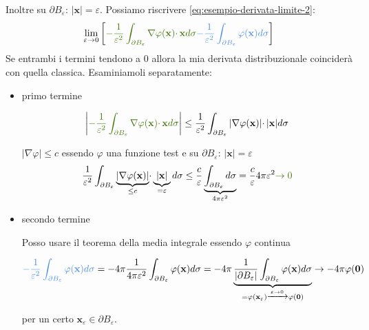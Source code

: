 \documentclass[10pt,a4paper,twoside,openright]{book}
\newcommand{\x}{\mathbf{x}}
\newcommand{\zer}{\mathbf{0}}
\begin{document}
Inoltre su $\displaystyle \partial B_{\varepsilon }$: $\displaystyle | \x| =\varepsilon $. Possiamo riscrivere \eqref{eq:esempio-derivata-limite-2}:
\begin{equation*}
	\lim _{\varepsilon \rightarrow 0}\left[\textcolor[rgb]{0.25,0.46,0.02}{-\frac{1}{\varepsilon ^{2}}\int _{\partial B_{\varepsilon }} \nabla \varphi (\x) \cdotp \x d\sigma }\textcolor[rgb]{0.29,0.56,0.89}{-\frac{1}{\varepsilon ^{2}}\int _{\partial B_{\varepsilon }} \varphi (\x) d\sigma }\right]
\end{equation*}
Se entrambi i termini tendono a $0$ allora la mia derivata distribuzionale coinciderà con quella classica. Esaminiamoli separatamente:
\begin{itemize}
	\item primo termine
	      
	      \begin{equation*}
	      	\left| \textcolor[rgb]{0.25,0.46,0.02}{-\frac{1}{\varepsilon ^{2}}\int _{\partial B_{\varepsilon }} \nabla \varphi (\x) \cdotp \x d\sigma }\right| \leqslant \frac{1}{\varepsilon ^{2}}\int _{\partial B_{\varepsilon }}| \nabla \varphi (\x)| \cdotp | \x| d\sigma 
	      \end{equation*}
	      
	      $\displaystyle | \nabla \varphi | \leqslant c$ essendo $\displaystyle \varphi $ una funzione test e su $\displaystyle \partial B_{\varepsilon }$: $\displaystyle | \x| =\varepsilon $\begin{equation*}
	      \frac{1}{\varepsilon ^{2}}\int _{\partial B_{\varepsilon }}\underbrace{| \nabla \varphi (\x)| }_{\leqslant c} \cdotp \underbrace{| \x| }_{=\varepsilon } d\sigma \leqslant \frac{c}{\varepsilon }\underbrace{\int _{\partial B_{\varepsilon }} d\sigma }_{4\pi \varepsilon ^{2}} =\frac{c}{\varepsilon } 4\pi \varepsilon ^{2}\textcolor[rgb]{0.25,0.46,0.02}{\rightarrow 0}
	\end{equation*}
	\item secondo termine
	      
	      Posso usare il teorema della media integrale essendo $\displaystyle \varphi $ continua
	      
	      \begin{equation*}
	      	\textcolor[rgb]{0.29,0.56,0.89}{-\frac{1}{\varepsilon ^{2}}\int _{\partial B_{\varepsilon }} \varphi (\x) d\sigma } =-4\pi \frac{1}{4\pi \varepsilon ^{2}}\int _{\partial B_{\varepsilon }} \varphi (\x) d\sigma =-4\pi \underbrace{\frac{1}{| \partial B_{\varepsilon }| }\int _{\partial B_{\varepsilon }} \varphi (\x) d\sigma }_{=\varphi (\x_{\varepsilon })\xrightarrow{\varepsilon \rightarrow 0} \varphi (\zer)}\rightarrow -4\pi \varphi (\zer)
	      \end{equation*}
	      
	      per un certo $\displaystyle \x_{\varepsilon } \in \partial B_{\varepsilon }$.
\end{itemize}
\end{document}
